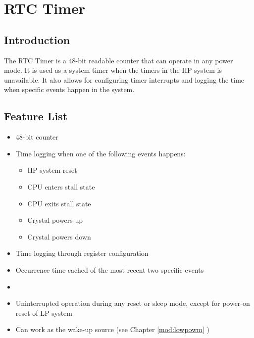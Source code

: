 \documentclass[main\_\_EN.tex]{subfiles}
\begin{document}

\ifglobal
\else
    \listoftodos
    {\let\clearpage\relax \listofdonetodos}
    \tableofcontents
\fi



\hypertarget{rtctimer}{}
\chapter{RTC Timer}
\label{mod:rtctimer}


\section{Introduction}

The RTC Timer is a 48-bit readable counter that can operate in any power mode. It is used as a system timer when the timers in the HP system is unavailable. It also allows for configuring timer interrupts and logging the time when specific events happen in the system.

\section{Feature List} \label{sec:rtctimer-features}

\begin{itemize}
    \item 48-bit counter
    \item Time logging when one of the following events happens:
    \begin{itemize}
        \item HP system reset
        \item CPU enters stall state
        \item CPU exits stall state
        \item Crystal powers up
        \item Crystal powers down
    \end{itemize}
    \item Time logging through register configuration
    \item Occurrence time cached of the most recent two specific events
    \item {}
    \item Uninterrupted operation during any reset or sleep mode, except for power-on reset of LP system
    \item Can work as the wake-up source (see Chapter \ref{mod:lowpowm} \textit{})
\end{itemize}
\end{document}
